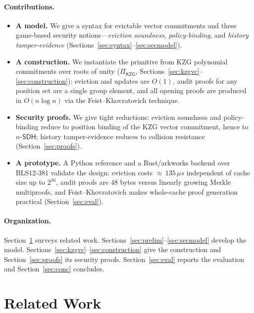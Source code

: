 \documentclass[version=submission]{iacrcc}
\theoremstyle{definition}
\newcommand{\nsdh}{n\text{-}\mathsf{SDH}}
\begin{document}
\paragraph{Contributions.}
\begin{itemize}[leftmargin=1.4em,itemsep=2pt]
  \item \textbf{A model.} We give a syntax for evictable vector commitments and
        three game-based security notions---\emph{eviction soundness},
        \emph{policy-binding}, and \emph{history tamper-evidence}
        (Sections~\ref{sec:syntax}--\ref{sec:secmodel}).
  \item \textbf{A construction.} We instantiate the primitive from KZG
        polynomial commitments over roots of unity ($\Pi_{\mathsf{KZG}}$,
        Sections~\ref{sec:kzgvc}--\ref{sec:construction}): eviction and updates
        are $O(1)$, audit proofs for any position set are a single group
        element, and all opening proofs are produced in $O(n\log n)$ via the
        Feist--Khovratovich technique.
  \item \textbf{Security proofs.} We give tight reductions: eviction soundness
        and policy-binding reduce to position binding of the KZG vector
        commitment, hence to $\nsdh$; history tamper-evidence reduces to
        collision resistance (Section~\ref{sec:proofs}).
  \item \textbf{A prototype.} A Python reference and a Rust/arkworks backend over
        BLS12-381 validate the design: eviction costs ${\approx}\,135\,\mu s$
        independent of cache size up to $2^{16}$, audit proofs are $48$ bytes
        versus linearly growing Merkle multiproofs, and Feist--Khovratovich makes
        whole-cache proof generation practical (Section~\ref{sec:eval}).
\end{itemize}

\paragraph{Organization.}
Section~\ref{sec:related} surveys related work. Sections~\ref{sec:prelim}--\ref{sec:secmodel}
develop the model. Sections~\ref{sec:kzgvc}--\ref{sec:construction} give the
construction and Section~\ref{sec:proofs} its security proofs.
Section~\ref{sec:eval} reports the evaluation and Section~\ref{sec:conc}
concludes.

\section{Related Work}\label{sec:related}
\end{document}
